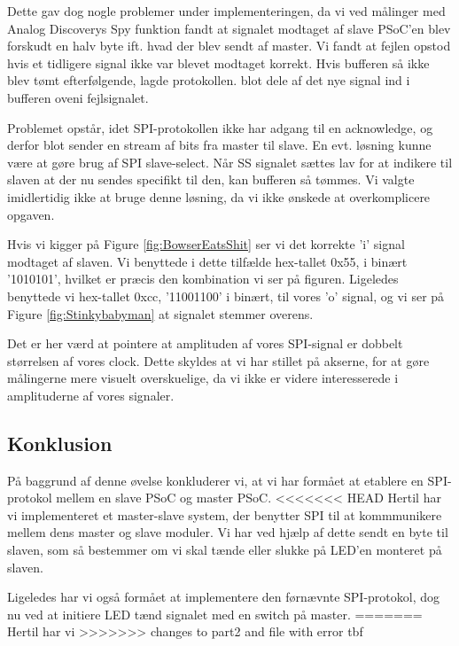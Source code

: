 \documentclass[../main.tex]{subfiles}
\begin{document}
Dette gav dog nogle problemer under implementeringen, da vi ved målinger med Analog Discoverys Spy funktion fandt at signalet modtaget af slave PSoC'en blev forskudt en halv byte 
ift. hvad der blev sendt af master. Vi fandt at fejlen opstod hvis et tidligere signal ikke var blevet modtaget korrekt. Hvis bufferen så ikke blev tømt efterfølgende, lagde protokollen.
blot dele af det nye signal ind i bufferen oveni fejlsignalet.

Problemet opstår, idet SPI-protokollen ikke har adgang til en acknowledge, og derfor blot sender en stream af bits fra master til slave. En evt. løsning kunne være at gøre brug af 
SPI slave-select. Når SS signalet sættes lav for at indikere til slaven at der nu sendes specifikt til den, kan bufferen så tømmes. Vi valgte imidlertidig ikke at bruge denne løsning,
da vi ikke ønskede at overkomplicere opgaven.

Hvis vi kigger på Figure \ref{fig:BowserEatsShit} ser vi det korrekte 'i' signal modtaget af slaven. Vi benyttede i dette tilfælde hex-tallet 0x55, i binært '1010101', hvilket er præcis 
den kombination vi ser på figuren. Ligeledes benyttede vi hex-tallet 0xcc, '11001100' i binært, til vores 'o' signal, og vi ser på Figure \ref{fig:Stinkybabyman} at signalet stemmer overens.

Det er her værd at pointere at amplituden af vores SPI-signal er dobbelt størrelsen af vores clock. Dette skyldes at vi har stillet på akserne, for at gøre målingerne mere visuelt
 overskuelige, da vi ikke er videre interesserede i amplituderne af vores signaler.

\subsection{Konklusion}
På baggrund af denne øvelse konkluderer vi, at vi har formået at etablere en SPI-protokol mellem en slave PSoC og master PSoC. 
<<<<<<< HEAD
Hertil har vi implementeret et master-slave system, der benytter SPI til at kommmunikere mellem dens master og slave moduler. 
Vi har ved hjælp af dette sendt en byte til slaven, som så bestemmer om vi skal tænde eller slukke på LED'en monteret på slaven.

Ligeledes har vi også formået at implementere den førnævnte SPI-protokol, dog nu ved at initiere LED tænd signalet med en switch på master.
=======
Hertil har vi 
>>>>>>> changes to part2 and file with error tbf
\end{document}
